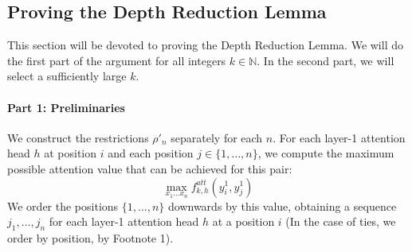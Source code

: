 \documentclass[11pt,a4paper]{article}
\begin{document}


\subsection{Proving the Depth Reduction Lemma}
This section will be devoted to proving the Depth Reduction Lemma.
We will do the first part of the argument for all integers $k \in \mathbb{N}$.
In the second part, we will select a sufficiently large $k$. %

\paragraph{Part 1: Preliminaries}


We construct the restrictions $\rho'_n$ separately for each $n$.
For each layer-1 attention head $h$ at position $i$ and each position $j \in \{1, \dots, n\}$, we compute the maximum possible attention value that can be achieved for this pair:
\begin{equation}
\max_{x_1\dots x_n} f^{att}_{k,h}(y^{1}_i, y^{1}_j)
\end{equation}
We order the positions $\{1, \dots, n\}$ downwards by this value, obtaining a sequence $j_1, \dots, j_n$ for each layer-1 attention head $h$ at a position $i$ (In the case of ties, we order by  position, by Footnote 1).
\end{document}
